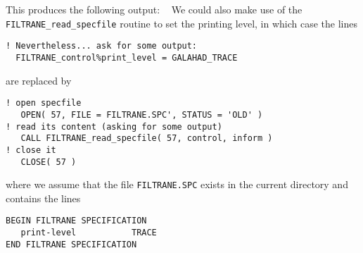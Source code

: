 \documentclass{galahad}
\newcommand{\packagename}{FILTRANE}
\begin{document}
\noindent
This produces the following output:
{\tt \small
\VerbatimInput{\packageresults}
}
\noindent
We could also make use of the {\tt \packagename\_read\_specfile} routine to
set the printing level, in which case the lines
{\small
\begin{verbatim}
! Nevertheless... ask for some output:
  FILTRANE_control%print_level = GALAHAD_TRACE
\end{verbatim}
}
\noindent
are replaced by
{\small
\begin{verbatim}
! open specfile
   OPEN( 57, FILE = FILTRANE.SPC', STATUS = 'OLD' )
! read its content (asking for some output)
   CALL FILTRANE_read_specfile( 57, control, inform )
! close it
   CLOSE( 57 )
\end{verbatim}
}
\noindent
where we assume that the file {\tt FILTRANE.SPC} exists in the current
directory and contains the lines
{\small
\begin{verbatim}
BEGIN FILTRANE SPECIFICATION
   print-level           TRACE
END FILTRANE SPECIFICATION
\end{verbatim}
}
\end{document}
